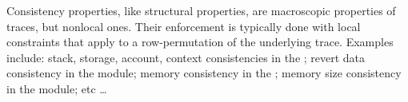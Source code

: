 Consistency properties, like structural properties, are macroscopic properties of traces, but nonlocal ones. Their enforcement is typically done with local constraints that apply to a row-permutation of the underlying trace. Examples include: stack, storage, account, context consistencies in the \hubMod; revert data consistency in the \hubMod{} module; memory consistency in the \mmioMod{}; memory size consistency in the \mxpMod{} module; etc \dots{}
